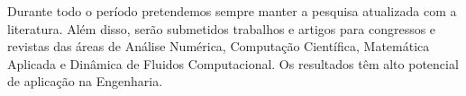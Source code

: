 \documentclass[12pt]{article}
\begin{document}
Durante todo o período pretendemos sempre manter a pesquisa atualizada com a literatura. Além disso, serão submetidos trabalhos e artigos para congressos e revistas das áreas de Análise Numérica, Computação Científica, Matemática Aplicada e Dinâmica de Fluidos Computacional. Os resultados têm alto potencial de aplicação na Engenharia.

\begin{footnotesize}


\end{footnotesize}
\end{document}
